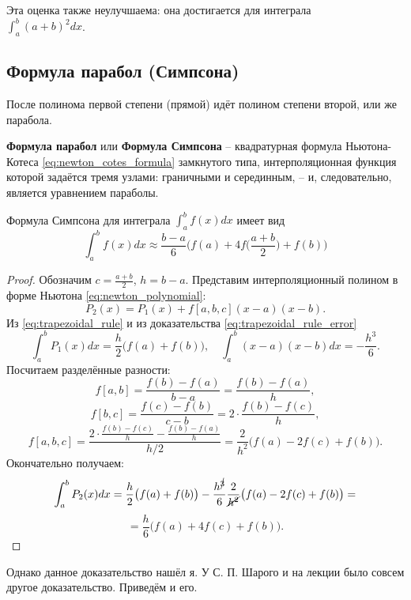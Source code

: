 \documentclass[../main.tex]{subfile}
\begin{document}
Эта оценка также неулучшаема: она достигается для интеграла\\
$\int_a^b (a+b)^2dx$.

\subsection{Формула парабол (Симпсона)}
После полинома первой степени (прямой) идёт полином степени второй, или же
парабола.

\begin{define}
	\textbf{Формула парабол} или \textbf{Формула Симпсона} -- квадратурная
	формула Ньютона-Котеса \eqref{eq:newton_cotes_formula} замкнутого типа,
	интерполяционная функция которой задаётся тремя узлами: граничными и
	серединным, -- и, следовательно, является уравнением параболы.
\end{define}

\begin{theorem}\label{eq:simpsons_1_3_rule}
	Формула Симпсона для интеграла $\int_a^b f(x)dx$ имеет вид
	\[\boxed{\int_a^b f(x)dx\approx\frac{b-a}{6}\Big(f(a)+4f\big(\frac{a+b}
	{2}\big)+f(b)\Big)}\]
\end{theorem}

\begin{proof}
	Обозначим $c=\frac{a+b}{2}$, $h=b-a$. Представим интерполяционный полином
	в форме Ньютона
	\eqref{eq:newton_polynomial}:
	\[P_2(x)=P_1(x)+f[a,b,c](x-a)(x-b).\]
	Из \eqref{eq:trapezoidal_rule} и из доказательства
	\eqref{eq:trapezoidal_rule_error}
	\[\int_a^b P_1(x)dx=\frac{h}{2}\big(f(a)+f(b)\big),\quad\int_a^b (x-a)
	(x-b)dx=-\frac{h^3}{6}.\]
	Посчитаем разделённые разности:
	\[f[a,b]=\frac{f(b)-f(a)}{b-a}=\frac{f(b)-f(a)}{h},\]
	\[f[b,c]=\frac{f(c)-f(b)}{c-b}=2\cdot\frac{f(b)-f(c)}{h},\]
	\[f[a,b,c]=\frac{2\cdot\frac{f(b)-f(c)}{h}-\frac{f(b)-f(a)}{h}}{h/2}=
	\frac{2}{h^2}\big(f(a)-2f(c)+f(b)\big).\]
	Окончательно получаем:
	\[\int_a^b P_2(x)dx=\frac{h}{2}\big(f(a)+f(b)\big)-\frac{h^{\cancel{3}}}
	{6}\frac{2}{\cancel{h^2}}\big(f(a)-2f(c)+f(b)\big)=\]
	\[=\frac{h}{6}\big(f(a)+4f(c)+f(b)\big).\]
\end{proof}

Однако данное доказательство нашёл я. У С. П. Шарого и на лекции было совсем
другое доказательство. Приведём и его.
\end{document}
